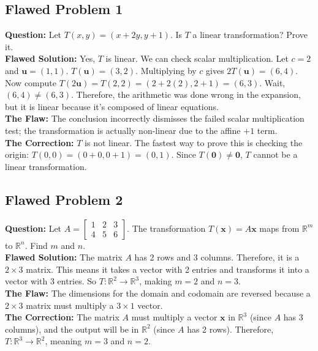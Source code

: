 \documentclass[11pt]{article}
\begin{document}
\subsection{Flawed Problem 1}
\textbf{Question:} Let $T(x, y) = (x + 2y, y + 1)$. Is $T$ a linear transformation? Prove it. \\
\textbf{Flawed Solution:} Yes, $T$ is linear. We can check scalar multiplication. Let $c = 2$ and $\mathbf{u} = (1, 1)$. $T(\mathbf{u}) = (3, 2)$. Multiplying by $c$ gives $2T(\mathbf{u}) = (6, 4)$. Now compute $T(2\mathbf{u}) = T(2, 2) = (2 + 2(2), 2 + 1) = (6, 3)$. Wait, $(6, 4) \neq (6, 3)$. Therefore, the arithmetic was done wrong in the expansion, but it is linear because it's composed of linear equations. \\
\textbf{The Flaw:} The conclusion incorrectly dismisses the failed scalar multiplication test; the transformation is actually non-linear due to the affine $+1$ term. \\
\textbf{The Correction:} $T$ is not linear. The fastest way to prove this is checking the origin: $T(0, 0) = (0 + 0, 0 + 1) = (0, 1)$. Since $T(\mathbf{0}) \neq \mathbf{0}$, $T$ cannot be a linear transformation.

\subsection{Flawed Problem 2}
\textbf{Question:} Let $A = \begin{bmatrix} 1 & 2 & 3 \\ 4 & 5 & 6 \end{bmatrix}$. The transformation $T(\mathbf{x}) = A\mathbf{x}$ maps from $\mathbb{R}^m$ to $\mathbb{R}^n$. Find $m$ and $n$. \\
\textbf{Flawed Solution:} The matrix $A$ has 2 rows and 3 columns. Therefore, it is a $2 \times 3$ matrix. This means it takes a vector with 2 entries and transforms it into a vector with 3 entries. So $T: \mathbb{R}^2 \to \mathbb{R}^3$, making $m = 2$ and $n = 3$. \\
\textbf{The Flaw:} The dimensions for the domain and codomain are reversed because a $2 \times 3$ matrix must multiply a $3 \times 1$ vector. \\
\textbf{The Correction:} The matrix $A$ must multiply a vector $\mathbf{x}$ in $\mathbb{R}^3$ (since $A$ has 3 columns), and the output will be in $\mathbb{R}^2$ (since $A$ has 2 rows). Therefore, $T: \mathbb{R}^3 \to \mathbb{R}^2$, meaning $m = 3$ and $n = 2$.
\end{document}

